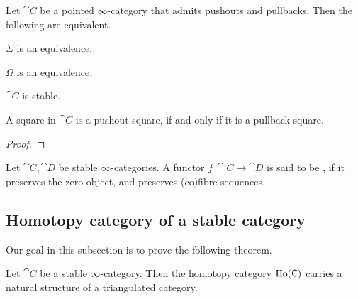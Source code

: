\begin{proposition}
    Let $\cat C$ be a pointed $\infty$-category 
    that admits pushouts and pullbacks. Then the following are equivalent.
    \begin{itms}
        \item $\Sigma$ is an equivalence.
        \item $\Omega$ is an equivalence.
        \item $\cat C$ is stable.
        \item A square in $\cat C$ is a pushout square,
        if and only if it is a pullback square.
    \end{itms}
\end{proposition}

\begin{proof}
    \nyw
\end{proof}

\begin{definition}
    Let $\cat C,\cat D$ be stable $\infty$-categories.
    A functor $f\:\cat C\to\cat D$ is said to be ,
    if it preserves the zero object,
    and preserves (co)fibre sequences.
\end{definition}

\subsection{Homotopy category of a stable category}

Our goal in this subsection is to prove the following theorem.

\begin{theorem}
    Let $\cat C$ be a stable $\infty$-category.
    Then the homotopy category $\operatorname{Ho}(\mathsf{C})$
    carries a natural structure of a triangulated category.
\end{theorem}

